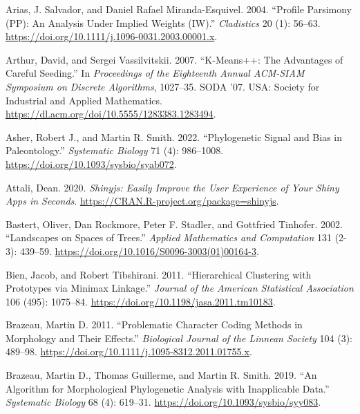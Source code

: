 \hypertarget{refs}{}
\begin{CSLReferences}{1}{0}
\leavevmode{}%
Arias, J. Salvador, and Daniel Rafael Miranda-Esquivel. 2004. {``Profile Parsimony ({PP}): An Analysis Under Implied Weights ({IW}).''} \emph{Cladistics} 20 (1): 56--63. \url{https://doi.org/10.1111/j.1096-0031.2003.00001.x}.

\leavevmode{}%
Arthur, David, and Sergei Vassilvitskii. 2007. {``K-Means++: The Advantages of Careful Seeding.''} In \emph{Proceedings of the Eighteenth Annual {ACM-SIAM} Symposium on {Discrete} Algorithms}, 1027--35. {SODA} '07. {USA}: {Society for Industrial and Applied Mathematics}. \url{https://dl.acm.org/doi/10.5555/1283383.1283494}.

\leavevmode{}%
Asher, Robert J., and Martin R. Smith. 2022. {``Phylogenetic Signal and Bias in Paleontology.''} \emph{Systematic Biology} 71 (4): 986--1008. \url{https://doi.org/10.1093/sysbio/syab072}.

\leavevmode{}%
Attali, Dean. 2020. \emph{Shinyjs: Easily Improve the User Experience of Your Shiny Apps in Seconds}. \url{https://CRAN.R-project.org/package=shinyjs}.

\leavevmode{}%
Bastert, Oliver, Dan Rockmore, Peter F. Stadler, and Gottfried Tinhofer. 2002. {``Landscapes on Spaces of Trees.''} \emph{Applied Mathematics and Computation} 131 (2-3): 439--59. \url{https://doi.org/10.1016/S0096-3003(01)00164-3}.

\leavevmode{}%
Bien, Jacob, and Robert Tibshirani. 2011. {``Hierarchical Clustering with Prototypes via Minimax Linkage.''} \emph{Journal of the American Statistical Association} 106 (495): 1075--84. \url{https://doi.org/10.1198/jasa.2011.tm10183}.

\leavevmode{}%
Brazeau, Martin D. 2011. {``Problematic Character Coding Methods in Morphology and Their Effects.''} \emph{Biological Journal of the Linnean Society} 104 (3): 489--98. \url{https://doi.org/10.1111/j.1095-8312.2011.01755.x}.

\leavevmode{}%
Brazeau, Martin D., Thomas Guillerme, and Martin R. Smith. 2019. {``An Algorithm for Morphological Phylogenetic Analysis with Inapplicable Data.''} \emph{Systematic Biology} 68 (4): 619--31. \url{https://doi.org/10.1093/sysbio/syy083}.


\end{CSLReferences}
